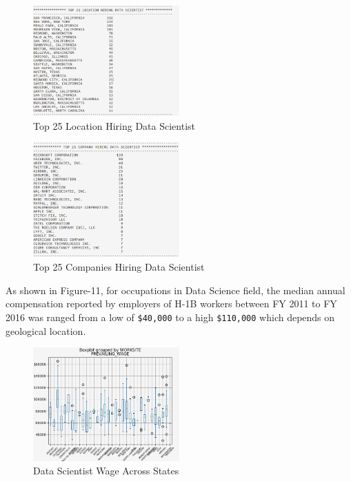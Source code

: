 \documentclass[9pt,twocolumn,twoside]{styles/osajnl}
\begin{document}
\begin{figure}[H]
  \centering
  \includegraphics[width=0.5\textwidth]{images/image12}  
   \vspace{-1em}
  \caption{Top 25 Location Hiring Data Scientist}
   \vspace{-1em}
  \end{figure}

\begin{figure}[H]
  \centering
  \includegraphics[width=0.5\textwidth]{images/image15}
     \vspace{-1em}
  \caption{Top 25 Companies Hiring Data Scientist}
     \vspace{-1em}
  \end{figure}
  

As shown in Figure-11, for occupations in Data Science field, the median annual compensation reported by employers of H-1B workers  between FY 2011 to FY 2016 was ranged from a low of \verb|$40,000| to  a high \verb|$110,000| which depends on geological location. 

\begin{figure}[H]
  \centering
  \includegraphics[width=0.5\textwidth]{images/image16} 
    \vspace{-1em}
  \caption{Data Scientist Wage Across States}
    \vspace{-1em}
  \end{figure}
\end{document}
